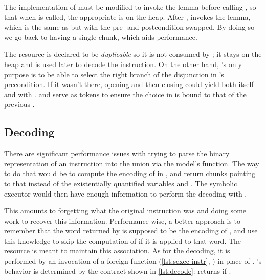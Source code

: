 The \usail implementation of  must be modified to invoke the lemma before calling , so that when  is called, the appropriate  is on the heap. After ,  invokes the  lemma, which is the same as  but with the pre- and postcondition swapped. By doing so we go back to having a single  chunk, which aids performance.

The  resource is declared to be \emph{duplicable} so it is not consumed by ; it stays on the heap and is used later to decode the instruction. On the other hand, 's only purpose is to be able to select the right branch of the disjunction in 's precondition. If it wasn't there, opening and then closing  could yield both  itself and  with .  and  serve as tokens to ensure the choice in  is bound to that of the previous .

\subsection{Decoding}
\label{sec:block-verifier-decode}

There are significant performance issues with trying to parse the binary representation of an instruction into the  union via the model's  function. The way to do that would be to compute the encoding of  in , and return  chunks pointing to that instead of the existentially quantified variables  and . The symbolic executor would then have enough information to perform the decoding with .

This amounts to forgetting what the original instruction was and doing some work to recover this information. Performance-wise, a better approach is to remember that the word returned by  is supposed to be the encoding of , and use this knowledge to skip the computation of  if it is applied to that word. The  resource is meant to maintain this association. As for the decoding, it is performed by an invocation of a foreign function  (\cref{lst:sexec-instr}, ) in place of . 's behavior is determined by the contract shown in \cref{lst:decode}:  returns  if .

